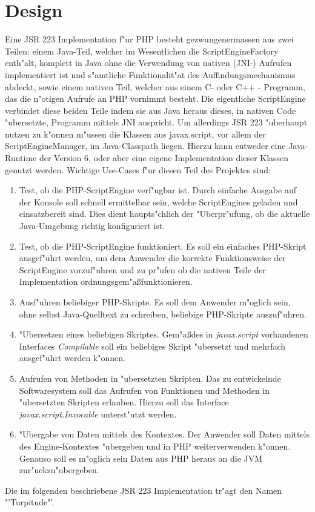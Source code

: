 \section{Design}
\label{sec:chap1:design}

Eine JSR 223 Implementation f"ur PHP besteht gezwungenermassen aus zwei Teilen: einem Java-Teil, welcher im Wesentlichen
die ScriptEngineFactory enth"alt, komplett in Java ohne die Verwendung von nativen (JNI-) Aufrufen implementiert ist und
s"amtliche Funktionalit"at des Auffindungsmechanismus abdeckt, sowie einem nativen Teil, welcher aus 
einem C- oder C++ - Programm, das die n"otigen Aufrufe an PHP vornimmt besteht.
Die eigentliche ScriptEngine verbindet diese beiden Teile indem sie aus Java heraus dieses, in nativen Code "ubersetzte, 
Programm mittels JNI anspricht.
Um allerdings JSR 223 "uberhaupt nutzen zu k"onnen m"ussen die Klassen aus javax.script, vor allem der ScriptEngineManager, 
im Java-Classpath liegen. Hierzu kann entweder eine Java-Runtime der Version 6, oder aber eine eigene Implementation dieser
Klassen genutzt werden. Wichtige Use-Cases f"ur diesen Teil des Projektes sind:
\begin{enumerate}
\item Test, ob die PHP-ScriptEngine verf"ugbar ist. Durch einfache Ausgabe auf der Konsole soll schnell ermittelbar sein, welche
    ScriptEngines geladen und einsatzbereit sind. Dies dient haupts"chlich der "Uberpr"ufung, ob die aktuelle Java-Umgebung
    richtig konfiguriert ist.
\item Test, ob die PHP-ScriptEngine funktioniert. Es soll ein einfaches PHP-Skript ausgef"uhrt werden, um dem Anwender
    die korrekte Funktionsweise der ScriptEngine vorzuf"uhren und zu pr"ufen ob die nativen Teile der Implementation
    ordnungsgem"a\ss funktionieren.
\item Ausf"uhren beliebiger PHP-Skripte. Es soll dem Anwender m"oglich sein, ohne selbst Java-Quelltext zu schreiben, beliebige
    PHP-Skripte auszuf"uhren.
\item "Ubersetzen eines beliebigen Skriptes. Gem"a\ss des in \emph{javax.script} vorhandenen Interfaces \emph{Compilable} soll 
    ein beliebiges Skript "ubersetzt und mehrfach ausgef"uhrt werden k"onnen.
\item Aufrufen von Methoden in "ubersetzten Skripten. Das zu entwickelnde Softwaresystem soll das Aufrufen von Funktionen und
    Methoden in "ubersetzten Skripten erlauben. Hierzu soll das Interface \emph{javax.script.Invocable} unterst"utzt werden.
\item "Ubergabe von Daten mittels des Kontextes. Der Anwender soll Daten mittels des Engine-Kontextes "ubergeben und in PHP
    weiterverwenden k"onnen. Genauso soll es m"oglich sein Daten aus PHP heraus an die JVM zur"uckzu"ubergeben.
\end{enumerate}
Die im folgenden beschriebene JSR 223 Implementation tr"agt den Namen "'Turpitude"'.

